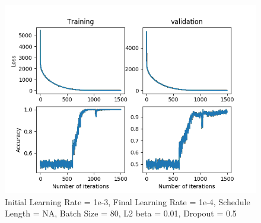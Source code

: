 \documentclass[12pt,reqno]{amsart}
\numberwithin{equation}{section}
\begin{document}
\begin{enumerate}
\begin{figure}[H]
\centering
\includegraphics[scale=0.6]{threshold-test-1e-3-1e-5-3}
\caption{Initial Learning Rate = 1e-3, Final Learning Rate = 1e-4, Schedule Length = NA, Batch Size = 80, L2 beta = 0.01, Dropout = 0.5}
\end{figure}

\end{enumerate}
\end{document}
